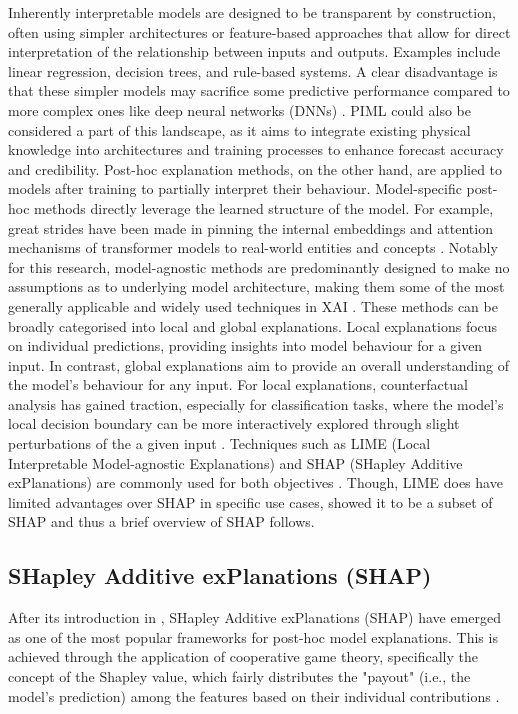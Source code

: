 Inherently interpretable models are designed to be transparent by construction, often using simpler architectures or feature-based approaches that allow for direct interpretation of the relationship between inputs and outputs. Examples include linear regression, decision trees, and rule-based systems. A clear disadvantage is that these simpler models may sacrifice some predictive performance compared to more complex ones like deep neural networks (DNNs) . PIML could also be considered a part of this landscape, as it aims to integrate existing physical knowledge into architectures and training processes to enhance forecast accuracy and credibility. Post-hoc explanation methods, on the other hand, are applied to models after training to partially interpret their behaviour. Model-specific post-hoc methods directly leverage the learned structure of the model. For example, great strides have been made in pinning the internal embeddings and attention mechanisms of transformer models to real-world entities and concepts . Notably for this research, model-agnostic methods are predominantly designed to make no assumptions as to underlying model architecture, making them some of the most generally applicable and widely used techniques in XAI . These methods can be broadly categorised into local and global explanations. Local explanations focus on individual predictions, providing insights into model behaviour for a given input. In contrast, global explanations aim to provide an overall understanding of the model's behaviour for any input. For local explanations, counterfactual analysis has gained traction, especially for classification tasks, where the model's local decision boundary can be more interactively explored through slight perturbations of the a given input \citep{Mothilal2019}. Techniques such as LIME (Local Interpretable Model-agnostic Explanations) and SHAP (SHapley Additive exPlanations) are commonly used for both objectives \citep{Lundberg2017}. Though, LIME does have limited advantages over SHAP in specific use cases, \cite{Lundberg2017} showed it to be a subset of SHAP and thus a brief overview of SHAP follows.

\subsection{SHapley Additive exPlanations (SHAP)}

After its introduction in \cite{Lundberg2017}, SHapley Additive exPlanations (SHAP) have emerged as one of the most popular frameworks for post-hoc model explanations. This is achieved through the application of cooperative game theory, specifically the concept of the Shapley value, which fairly distributes the "payout" (i.e., the model's prediction) among the features based on their individual contributions .

